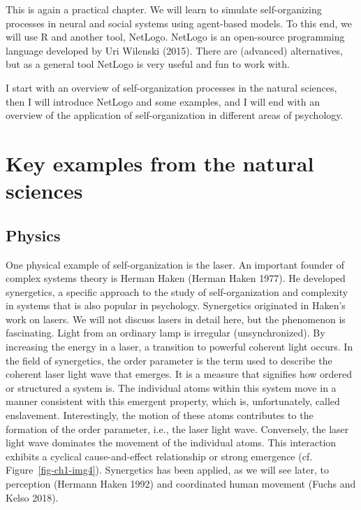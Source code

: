 \documentclass[
  a4paper,
  DIV=11,
  numbers=noendperiod,
  oneside]{scrreprt}
\begin{document}
This is again a practical chapter. We will learn to simulate
self-organizing processes in neural and social systems using agent-based
models. To this end, we will use R and another tool, NetLogo. NetLogo is
an open-source programming language developed by Uri Wilenski (2015).
There are (advanced) alternatives, but as a general tool NetLogo is very
useful and fun to work with.

I start with an overview of self-organization processes in the natural
sciences, then I will introduce NetLogo and some examples, and I will
end with an overview of the application of self-organization in
different areas of psychology.

\hypertarget{sec-Key-examples-from-the-natural-sciences}{%
\section{Key examples from the natural
sciences}\label{sec-Key-examples-from-the-natural-sciences}}

\hypertarget{sec-Physics}{%
\subsection{Physics}\label{sec-Physics}}

One physical example of self-organization is the laser. An important
founder of complex systems theory is Herman Haken (Herman Haken 1977).
He developed synergetics, a specific approach to the study of
self-organization and complexity in systems that is also popular in
psychology. Synergetics originated in Haken's work on lasers. We will
not discuss lasers in detail here, but the phenomenon is fascinating.
Light from an ordinary lamp is irregular (unsynchronized). By increasing
the energy in a laser, a transition to powerful coherent light occurs.
In the field of synergetics, the order parameter is the term used to
describe the coherent laser light wave that emerges. It is a measure
that signifies how ordered or structured a system is. The individual
atoms within this system move in a manner consistent with this emergent
property, which is, unfortunately, called enslavement. Interestingly,
the motion of these atoms contributes to the formation of the order
parameter, i.e., the laser light wave. Conversely, the laser light wave
dominates the movement of the individual atoms. This interaction
exhibits a cyclical cause-and-effect relationship or strong emergence
(cf. Figure~\ref{fig-ch1-img4}). Synergetics has been applied, as we
will see later, to perception (Hermann Haken 1992) and coordinated human
movement (Fuchs and Kelso 2018).
\end{document}
